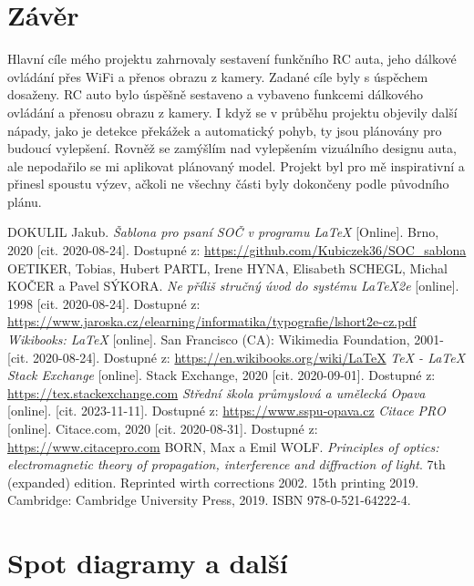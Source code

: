 \documentclass[12pt, a4paper,
oneside,      %
openany
]{report}
\begin{document}
	\chapter*{Závěr}
	\noindent Hlavní cíle mého projektu zahrnovaly sestavení funkčního RC auta, jeho dálkové ovládání přes WiFi a přenos obrazu z kamery. Zadané cíle byly s úspěchem dosaženy. RC auto bylo úspěšně sestaveno a vybaveno funkcemi dálkového ovládání a přenosu obrazu z kamery. I když se v průběhu projektu objevily další nápady, jako je detekce překážek a automatický pohyb, ty jsou plánovány pro budoucí vylepšení. Rovněž se zamýšlím nad vylepšením vizuálního designu auta, ale nepodařilo se mi aplikovat plánovaný model. Projekt byl pro mě inspirativní a přinesl spoustu výzev, ačkoli ne všechny části byly dokončeny podle původního plánu.
	
	\begin{thebibliography}{99}
		 DOKULIL Jakub. \textit{Šablona pro psaní SOČ v programu \LaTeX} [Online]. Brno, 2020 [cit. 2020-08-24]. Dostupné z: \url{https://github.com/Kubiczek36/SOC_sablona}
		OETIKER, Tobias, Hubert PARTL, Irene HYNA, Elisabeth SCHEGL, Michal KOČER a Pavel SÝKORA. \textit{Ne příliš stručný úvod do systému LaTeX2e} [online]. 1998 [cit. 2020-08-24]. Dostupné z: \url{https://www.jaroska.cz/elearning/informatika/typografie/lshort2e-cz.pdf}
		\textit{Wikibooks: LaTeX} [online]. San Francisco (CA): Wikimedia Foundation, 2001- [cit. 2020-08-24]. Dostupné z: \url{https://en.wikibooks.org/wiki/LaTeX}
		 \textit{TeX - LaTeX Stack Exchange} [online]. Stack Exchange, 2020 [cit. 2020-09-01]. Dostupné z: \url{https://tex.stackexchange.com}
		 \textit{Střední škola průmyslová a umělecká Opava} [online]. [cit. 2023-11-11]. Dostupné z: \url{https://www.sspu-opava.cz}
		\textit{Citace PRO} [online]. Citace.com, 2020 [cit. 2020-08-31]. Dostupné z: \url{https://www.citacepro.com}
		 BORN, Max a Emil WOLF. \textit{Principles of optics: electromagnetic theory of propagation, interference and diffraction of light}. 7th (expanded) edition. Reprinted wirth corrections 2002. 15th printing 2019. Cambridge: Cambridge University Press, 2019. ISBN 978-0-521-64222-4.
	\end{thebibliography}
	
	\listoffigures
	\listoftables
	
	\appendix %
	
	[\vspace{-22pt}] %
	
	
	\chapter{%
		Spot diagramy a další }
	
	
\end{document}
